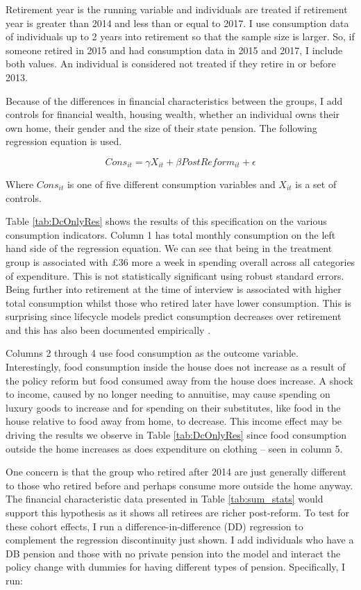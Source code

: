 \documentclass[12pt]{article}
\begin{document}
Retirement year is the running variable and individuals are treated if
retirement year is greater than 2014 and less than or equal to 2017. I use
consumption data of individuals up to 2 years into retirement so that the sample
size is larger. So, if someone retired in 2015 and had consumption data in 2015
and 2017, I include both values. An individual is considered not treated if they
retire in or before 2013.

Because of the differences in financial characteristics between the groups, I
add controls for financial wealth, housing wealth, whether an individual owns
their own home, their gender and the size of their state pension. The following
regression equation is used.

\begin{equation*}
    Cons_{it} =  \gamma X_{it} + \beta PostReform_{it} + \epsilon
\end{equation*}

Where $Cons_{it}$ is one of five different consumption variables and $X_{it}$ is
a set of controls.

Table \ref{tab:DcOnlyRes} shows the results of this specification on the various
consumption indicators. Column 1 has total monthly consumption on the left hand
side of the regression equation. We can see that being in the treatment group is
associated with £36 more a week in spending overall across all categories of
expenditure. This is not statistically significant using robust standard errors.
Being further into retirement at the time of interview is associated with higher
total consumption whilst those who retired later have lower consumption. This is
surprising since lifecycle models predict consumption decreases over retirement
and this has also been documented empirically \citep{hurd_rohwedder_nber_2003}.

Columns 2 through 4 use food consumption as the outcome variable. Interestingly,
food consumption inside the house does not increase as a result of the policy
reform but food consumed away from the house does increase. A shock to income,
caused by no longer needing to annuitise, may cause spending on luxury goods to
increase and for spending on their substitutes, like food in the house relative
to food away from home, to decrease. This income effect may be driving the
results we observe in Table \ref{tab:DcOnlyRes} since food consumption outside the
home increases as does expenditure on clothing -- seen in column 5.

One concern is that the group who retired after 2014 are just generally
different to those who retired before and perhaps consume more outside the home
anyway. The financial characteristic data presented in Table \ref{tab:sum_stats}
would support this hypothesis as it shows all retirees are richer post-reform.
To test for these cohort effects, I run a difference-in-difference (DD) regression to
complement the regression discontinuity just shown. I add individuals who have a
DB pension and those with no private pension into the model and interact the
policy change with dummies for having different types of pension. Specifically,
I run:
\end{document}
